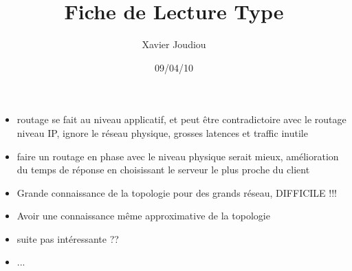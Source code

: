 \documentclass[11pt,a4paper]{article}
\title{Fiche de Lecture Type}
\author{Xavier Joudiou}
\date{09/04/10}
\begin{document}
	
  \begin{itemize}
  \renewcommand{\labelitemi}{$\Rightarrow$}
	\item routage se fait au niveau applicatif, et peut être contradictoire avec le routage niveau IP, ignore le réseau physique, grosses latences et traffic inutile
	\item faire un routage en phase avec le niveau physique serait mieux, amélioration du temps de réponse en choisissant le serveur le plus proche du client
	\item Grande connaissance de la topologie pour des grands réseau, DIFFICILE !!!
	\item Avoir une connaissance même approximative de la topologie
	\item suite pas intéressante ??
	\item ...
  \end{itemize}
\end{document}
